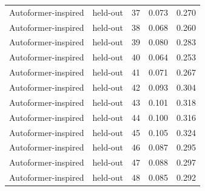 \begin{tabular}{llrrr}
Autoformer-inspired & held-out & 37 & 0.073 & 0.270 \\
Autoformer-inspired & held-out & 38 & 0.068 & 0.260 \\
Autoformer-inspired & held-out & 39 & 0.080 & 0.283 \\
Autoformer-inspired & held-out & 40 & 0.064 & 0.253 \\
Autoformer-inspired & held-out & 41 & 0.071 & 0.267 \\
Autoformer-inspired & held-out & 42 & 0.093 & 0.304 \\
Autoformer-inspired & held-out & 43 & 0.101 & 0.318 \\
Autoformer-inspired & held-out & 44 & 0.100 & 0.316 \\
Autoformer-inspired & held-out & 45 & 0.105 & 0.324 \\
Autoformer-inspired & held-out & 46 & 0.087 & 0.295 \\
Autoformer-inspired & held-out & 47 & 0.088 & 0.297 \\
Autoformer-inspired & held-out & 48 & 0.085 & 0.292 \\
\bottomrule
\end{tabular}
